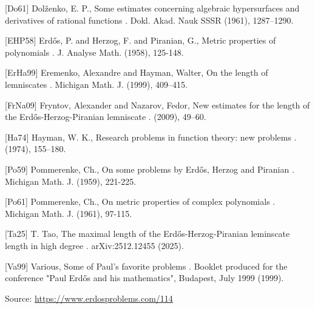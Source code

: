 \documentclass{article}
\begin{document}
[Do61] Dol\v zenko, E. P., Some estimates concerning algebraic hypersurfaces and derivatives of rational functions . Dokl. Akad. Nauk SSSR (1961), 1287--1290.

[EHP58] Erd\H{o}s, P. and Herzog, F. and Piranian, G., Metric properties of polynomials . J. Analyse Math. (1958), 125-148.

[ErHa99] Eremenko, Alexandre and Hayman, Walter, On the length of lemniscates . Michigan Math. J. (1999), 409--415.

[FrNa09] Fryntov, Alexander and Nazarov, Fedor, New estimates for the length of the {E}rd\H os-{H}erzog-{P}iranian lemniscate . (2009), 49--60.

[Ha74] Hayman, W. K., Research problems in function theory: new problems . (1974), 155--180.

[Po59] Pommerenke, Ch., On some problems by Erd\H{o}s, Herzog and Piranian . Michigan Math. J. (1959), 221-225.

[Po61] Pommerenke, Ch., On metric properties of complex polynomials . Michigan Math. J. (1961), 97-115.

[Ta25] T. Tao, The maximal length of the Erd\H{o}s-Herzog-Piranian leminscate length in high degree . arXiv:2512.12455 (2025).

[Va99] Various, Some of Paul's favorite problems . Booklet produced for the conference "Paul Erd\H{o}s and his mathematics", Budapest, July 1999 (1999).

\bigskip
\noindent\small{Source: \url{https://www.erdosproblems.com/114}}
\end{document}
